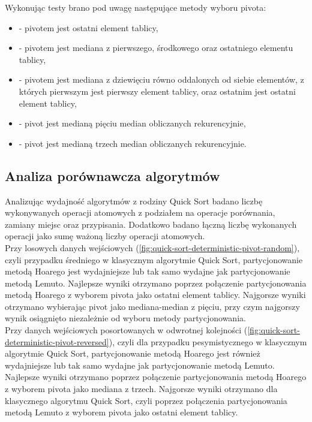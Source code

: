 Wykonując testy brano pod uwagę następujące metody wyboru pivota:
\begin{itemize}
	\setlength\itemsep{0em}
	\item {} - pivotem jest ostatni element tablicy,
	\item {} - pivotem jest mediana z pierwszego, środkowego oraz ostatniego elementu tablicy,
	\item {} - pivotem jest mediana z dziewięciu równo oddalonych od siebie elementów, z których pierwszym jest pierwszy element tablicy, oraz ostatnim jest ostatni element tablicy,
	\item {} - pivot jest medianą pięciu median obliczanych rekurencyjnie,
	\item {} - pivot jest medianą trzech median obliczanych rekurencyjnie.\\
\end{itemize}

\subsection{Analiza porównawcza algorytmów}

Analizując wydajność algorytmów z rodziny Quick Sort badano liczbę wykonywanych operacji atomowych z podziałem na operacje porównania, zamiany miejsc oraz przypisania. Dodatkowo badano łączną liczbę wykonanych operacji jako sumę ważoną liczby operacji atomowych.\\

Przy losowych danych wejściowych (\ref{fig:quick-sort-deterministic-pivot-random}), czyli przypadku średniego w klasycznym algorytmie Quick Sort, partycjonowanie metodą Hoarego jest wydajniejsze lub tak samo wydajne jak partycjonowanie metodą Lemuto. Najlepsze wyniki otrzymano poprzez połączenie partycjonowania metodą Hoarego z wyborem pivota jako ostatni element tablicy. Najgorsze wyniki otrzymano wybierając pivot jako mediana-median z pięciu, przy czym najgorszy wynik osiągnięto niezależnie od wyboru metody partycjonowania.\\

Przy danych wejściowych posortowanych w odwrotnej kolejności (\ref{fig:quick-sort-deterministic-pivot-reversed}), czyli dla przypadku pesymistycznego w klasycznym algorytmie Quick Sort, partycjonowanie metodą Hoarego jest również wydajniejsze lub tak samo wydajne jak partycjonowanie metodą Lemuto. Najlepsze wyniki otrzymano poprzez połączenie partycjonowania metodą Hoarego z wyborem pivota jako mediana z trzech. Najgorsze wyniki otrzymano dla klasycznego algorytmu Quick Sort, czyli poprzez połączenia partycjonowania metodą Lemuto z wyborem pivota jako ostatni element tablicy.\\

